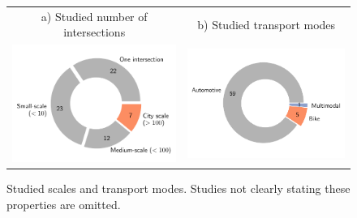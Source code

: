 \begin{figure}[t]
\centering
\begin{tabular}{cc}
  \footnotesize{a) Studied number of intersections} & \footnotesize{b) Studied transport modes} \\
  \includegraphics[width=0.46\linewidth]{images/related-work-scale-piechart.pdf} &
  \includegraphics[width=0.46\linewidth]{images/related-work-modes-piechart.pdf}  \\
\end{tabular}
\caption{Studied scales and transport modes. Studies not clearly stating these properties are omitted.}
\label{fig:related-work-additional-piecharts}
\end{figure}

